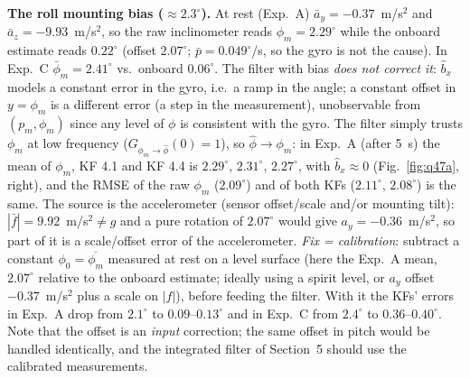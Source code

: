 \textbf{The roll mounting bias ($\approx2.3^\circ$).} At rest (Exp.~A) $\bar a_y=-0.37$~m/s$^2$ and $\bar a_z=-9.93$~m/s$^2$, so the raw inclinometer reads $\phi_m=2.29^\circ$
while the onboard estimate reads $0.22^\circ$ (offset $2.07^\circ$; $\bar p=0.049^\circ$/s, so the gyro is not the cause). In Exp.~C $\bar\phi_m=2.41^\circ$ vs.\ onboard $0.06^\circ$.
The filter with bias \emph{does not correct it}: $\hat b_x$ models a constant error in the gyro, i.e.\ a ramp in the angle; a constant offset in $y=\phi_m$ is a different error
(a step in the measurement), unobservable from $(p_m,\phi_m)$ since any level of $\phi$ is consistent with the gyro. The filter simply trusts $\phi_m$ at low frequency ($G_{\phi_m\to\hat\phi}(0)=1$),
so $\hat\phi\to\phi_m$: in Exp.~A (after 5~s) the mean of $\phi_m$, KF 4.1 and KF 4.4 is $2.29^\circ$, $2.31^\circ$, $2.27^\circ$, with $\hat b_x\approx0$ (Fig.~\ref{fig:q47a}, right), and the RMSE of the
raw $\phi_m$ ($2.09^\circ$) and of both KFs ($2.11^\circ$, $2.08^\circ$) is the same. The source is the accelerometer (sensor offset/scale and/or mounting tilt): $|\bar f|=9.92$~m/s$^2\neq g$ and a pure rotation of $2.07^\circ$
would give $a_y=-0.36$~m/s$^2$, so part of it is a scale/offset error of the accelerometer.
\emph{Fix = calibration}: subtract a constant $\phi_0=\overline{\phi_m}$ measured at rest on a level surface (here the Exp.~A mean, $2.07^\circ$ relative to the onboard estimate;
ideally using a spirit level, or $a_y$ offset $-0.37$~m/s$^2$ plus a scale on $|f|$), before feeding the filter. With it the KFs' errors in Exp.~A drop from $2.1^\circ$ to $0.09$--$0.13^\circ$ and in Exp.~C from $2.4^\circ$ to $0.36$--$0.40^\circ$.
Note that the offset is an \emph{input} correction; the same offset in pitch would be handled identically, and the integrated filter of Section~5 should use the calibrated measurements.
